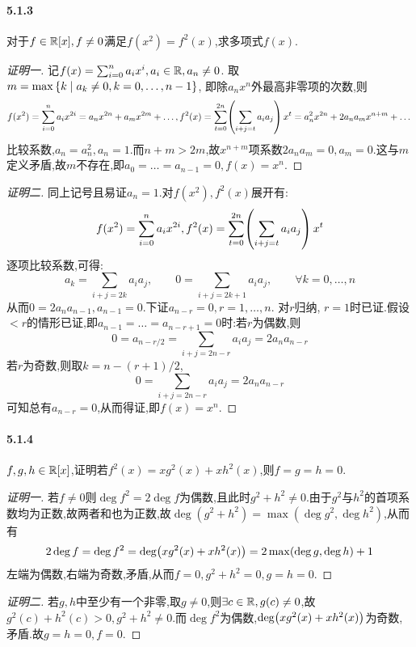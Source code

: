 \documentclass[11pt]{article}
\begin{document}
\paragraph{5.1.3}对于$f\in\mathbb{R}[x], f\neq 0$满足$f(x^2)=f^2(x)$,求多项式$f(x)$.
\begin{proof}[证明一]
    记$f(x)=\sum_{i=0}^{n}a_ix^i, a_i\in \mathbb{R}, a_n\neq 0$. 取$m=\max\left\{k\mid a_k\neq 0, k=0,\dots, n-1\right\}$, 即除$a_nx^n$外最高非零项的次数,则
    $$f(x^2)=\sum_{i=0}^{n}a_i x^{2i}=a_nx^{2n}+a_mx^{2m}+\dots, f^2(x)=\sum_{t=0}^{2n}\!\left(\sum_{i+j=t}a_ia_j\right)x^t=a_n^2 x^{2n}+2a_na_m x^{n+m}+\dots$$
    比较系数,$a_n=a_n^2, a_n=1$.而$n+m>2m$,故$x^{n+m}$项系数$2a_na_m=0, a_m=0$.这与$m$定义矛盾,故$m$不存在,即$a_0=\dots=a_{n-1}=0, f(x)=x^n$.
\end{proof}
\begin{proof}[证明二]
    同上记号且易证$a_n=1$.对$f(x^2),f^2(x)$展开有:
    $$f(x^2)=\sum_{i=0}^{n}a_i x^{2i}, f^2(x)=\sum_{t=0}^{2n}\!\left(\sum_{i+j=t}a_ia_j\right)x^t$$
    逐项比较系数,可得:
    $$a_k=\sum_{i+j=2k}a_ia_j,\qquad 0=\sum_{i+j=2k+1}a_ia_j,\qquad \forall k=0,\dots,n$$
    从而$0=2a_na_{n-1}, a_{n-1}=0$.下证$a_{n-r}=0, r=1,\dots,n$. 对$r$归纳, $r=1$时已证.假设$<r$的情形已证,即$a_{n-1}=\dots=a_{n-r+1}=0$时:若$r$为偶数,则
    $$0=a_{n-r/2}=\sum_{i+j=2n-r}a_ia_j=2a_na_{n-r}$$
    若$r$为奇数,则取$k=n-(r+1)/2$,
    $$0=\sum_{i+j=2n-r}a_ia_j=2a_na_{n-r}$$
    可知总有$a_{n-r}=0$,从而得证,即$f(x)=x^n$.
\end{proof}
\paragraph{5.1.4}$f,g,h\in \mathbb{R}[x]$,证明若$f^2(x)=xg^2(x)+xh^2(x)$,则$f=g=h=0$.
\begin{proof}[证明一]
    若$f\neq 0$则$\deg f^2=2\deg f$为偶数,且此时$g^2+h^2\neq 0$.由于$g^2$与$h^2$的首项系数均为正数,故两者和也为正数,故$\deg(g^2+h^2)=\max(\deg g^2,\deg h^2)$,从而有
    $$2\deg f=\deg f^2=\deg\!\left(xg^2(x)+xh^2(x)\right)=2\max(\deg g,\deg h)+1$$
    左端为偶数,右端为奇数,矛盾,从而$f=0,g^2+h^2=0,g=h=0$.
\end{proof}
\begin{proof}[证明二]
    若$g,h$中至少有一个非零,取$g\neq 0$,则$\exists c\in\mathbb{R}, g(c)\neq 0$,故$g^2(c)+h^2(c)>0, g^2+h^2\neq 0$.而$\deg f^2$为偶数,$\deg\!\left(xg^2(x)+xh^2(x)\right)$为奇数,矛盾.故$g=h=0,f=0$.
\end{proof}
\end{document}

